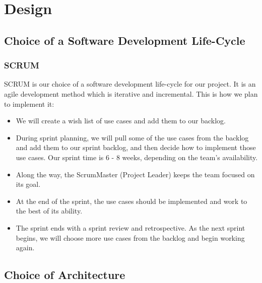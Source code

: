 \documentclass{article}
\begin{document}
\section{Design}
\subsection{Choice of a Software Development Life-Cycle}
\subsubsection{SCRUM}
SCRUM is our choice of a software development life-cycle for our project. It is an agile development method which is iterative and incremental.
This is how we plan to implement it:
\begin{itemize}
\item We will create a wish list of use cases and add them to our backlog.
\item During sprint planning, we will pull some of the use cases from the backlog and add them to our sprint backlog, and then decide how to implement those use cases.
Our sprint time is 6 - 8 weeks, depending on the team's availability. 
\item Along the way, the ScrumMaster (Project Leader) keeps the team focused on its goal.
\item At the end of the sprint, the use cases should be implemented and work to the best of its ability. 
\item The sprint ends with a sprint review and retrospective.
As the next sprint begins, we will choose more use cases from the backlog and begin working again. \cite{Scrum}
\end{itemize}
\subsection{Choice of Architecture}
\end{document}
